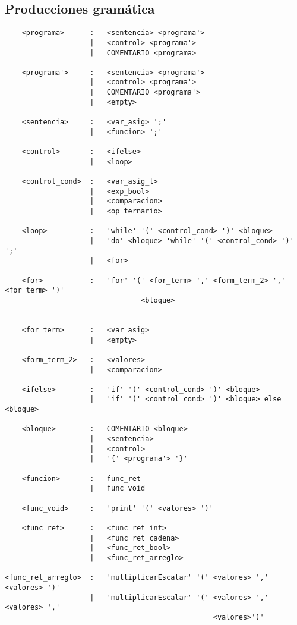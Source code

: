 \subsection{Producciones gramática}\label{sec:pgram}
\begin{verbatim}
    <programa>      :   <sentencia> <programa'>   
                    |   <control> <programa'>   
                    |   COMENTARIO <programa>   

    <programa'>     :   <sentencia> <programa'>   
                    |   <control> <programa'>   
                    |   COMENTARIO <programa'>   
                    |   <empty>

    <sentencia>     :   <var_asig> ';'
                    |   <funcion> ';'

    <control>       :   <ifelse>
                    |   <loop>

    <control_cond>  :   <var_asig_l>
                    |   <exp_bool>
                    |   <comparacion>
                    |   <op_ternario>

    <loop>          :   'while' '(' <control_cond> ')' <bloque>
                    |   'do' <bloque> 'while' '(' <control_cond> ')' ';' 
                    |   <for>

    <for>           :   'for' '(' <for_term> ',' <form_term_2> ',' <for_term> ')' 
                                <bloque>


    <for_term>      :   <var_asig> 
                    |   <empty>

    <form_term_2>   :   <valores>
                    |   <comparacion>

    <ifelse>        :   'if' '(' <control_cond> ')' <bloque>
                    |   'if' '(' <control_cond> ')' <bloque> else <bloque>

    <bloque>        :   COMENTARIO <bloque>
                    |   <sentencia>
                    |   <control>
                    |   '{' <programa'> '}'

    <funcion>       :   func_ret
                    |   func_void

    <func_void>     :   'print' '(' <valores> ')'

    <func_ret>      :   <func_ret_int>
                    |   <func_ret_cadena>
                    |   <func_ret_bool>
                    |   <func_ret_arreglo>

<func_ret_arreglo>  :   'multiplicarEscalar' '(' <valores> ',' <valores> ')'
                    |   'multiplicarEscalar' '(' <valores> ',' <valores> ',' 
                                                 <valores>')'
                    

\end{verbatim}
